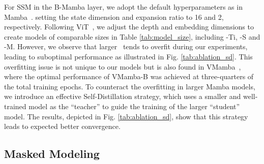 \begin{table}
  \vspace{-0.8cm}
  \centering
  \setlength\tabcolsep{4pt}
  \vspace{-0.2cm}
  \caption{\textbf{Different model sizes.}  due to its suboptimization.} 
  \label{tab:model_size}
  \vspace{-0.6cm}
\end{table}

For SSM in the B-Mamba layer,
we adopt the default hyperparameters as in Mamba~\cite{gu2023mamba}.
setting the state dimension and expansion ratio to 16 and 2, respectively.
Following ViT~\cite{vit},
we adjust the depth and embedding dimensions to create models of comparable sizes in Table \ref{tab:model_size}, 
including \ModelName-Ti, \ModelName-S and \ModelName-M. 
However, 
we observe that larger \ModelName\ tends to overfit during our experiments, 
leading to suboptimal performance as illustrated in Fig. \ref{tab:ablation_sd}. 
This overfitting issue is not unique to our models but is also found in VMamba~\cite{vmamba}, 
where the optimal performance of VMamba-B was achieved at three-quarters of the total training epochs. 
To counteract the overfitting in larger Mamba models, 
we introduce an effective Self-Distillation strategy,
which uses a smaller and well-trained model as the ``teacher'' to guide the training of the larger ``student'' model. 
The results, depicted in Fig. \ref{tab:ablation_sd}, show that this strategy leads to expected better convergence.

\subsection{Masked Modeling}

